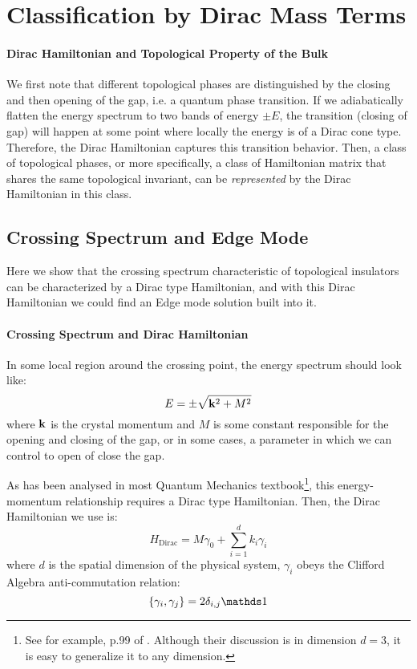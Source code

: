 \section{Classification by Dirac Mass Terms}
\label{sec:The Minimal Hamiltonian Approach}

\paragraph{Dirac Hamiltonian and Topological Property of the Bulk}
We first note that different topological phases are distinguished by the closing
and then opening of the gap, i.e. a quantum phase transition. If we adiabatically
flatten the energy spectrum to two bands of energy $\pm E$, the transition
(closing of gap) will happen at some point where locally the energy is of a
Dirac cone type. Therefore, the Dirac Hamiltonian captures this transition
behavior. Then, a class of topological phases, or more specifically, a class of
Hamiltonian matrix that shares the same topological invariant, can be
\textit{represented} by the Dirac Hamiltonian in this class.

\subsection{Crossing Spectrum and Edge Mode}
\label{sec:Crossing Spectrum and Edge Mode}
Here we show that the crossing spectrum characteristic of topological insulators
can be characterized by a Dirac type Hamiltonian, and with this Dirac
Hamiltonian we could find an Edge mode solution built into it.

\paragraph{Crossing Spectrum and Dirac Hamiltonian}
In some local region around the crossing point, the energy spectrum should look
like:
\begin{equation}
    E = \pm \sqrt{\vb{k}^2 + M^2}
\end{equation}
where $\vb{k}$ is the crystal momentum and $M$ is some constant
responsible for the opening and closing of the gap, or in some cases, a parameter
in which we can control to open of close the gap.

As has been analysed in most Quantum Mechanics textbook\footnote{See for
    example, p.99 of \cite{Greiner1997}. Although their discussion is in
dimension $d=3$, it is easy to generalize it to any dimension.}, this energy-momentum
relationship requires a Dirac type Hamiltonian. Then, the Dirac Hamiltonian we
use is:
\begin{equation}
    \label{eq:dirac-H}
    H_\text{Dirac} = M\gamma_0 + \sum_{i=1}^d k_i\gamma_i
\end{equation}
where $d$ is the spatial dimension of the physical system, $\gamma_i$ obeys the
Clifford Algebra anti-commutation relation:
\begin{equation}
    \{\gamma_i,\gamma_j\} = 2\delta_{i,j}\id
\end{equation}

